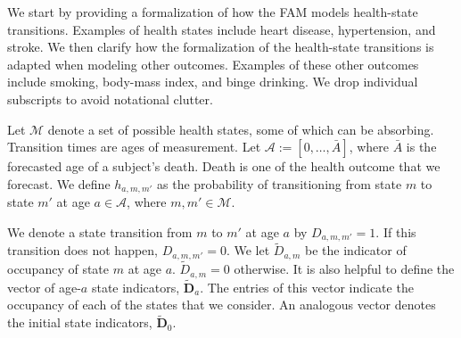 We start by providing a formalization of how the FAM models health-state transitions. Examples of health states include heart disease, hypertension, and stroke. We then clarify how the formalization of the health-state transitions is adapted when modeling other outcomes. Examples of these other outcomes include smoking, body-mass index, and binge drinking. We drop individual subscripts to avoid notational clutter.

Let $\mathcal{M}$ denote a set of possible health states, some of which can be absorbing. Transition times are ages of measurement. Let $\mathcal{A}:= [ 0, \ldots, \bar{A}]$, where $\bar{A}$ is the forecasted age of a subject's death. Death is one of the health outcome that we forecast. We define $h_{a,m,m'}$ as the probability of transitioning from state $m$ to state $m'$ at age $a \in \mathcal{A}$, where $m, m' \in \mathcal{M}$.

We denote a state transition from $m$ to $m'$ at age $a$ by $D_{a,m,m'} = 1$. If this transition does not happen,  $D_{a,m,m'} = 0$. We let $\tilde{D}_{a,m}$ be the indicator of occupancy of state $m$ at age $a$. $\tilde{D}_{a,m} = 0$ otherwise. It is also helpful to define the vector of age-$a$ state indicators, $\tilde{\bm{D}}_a$. The entries of this vector indicate the occupancy of each of the states that we consider. An analogous vector denotes the initial state indicators, $\tilde{\bm{D}}_0$.

